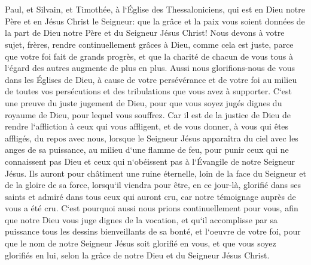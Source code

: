 

\chapter{}

\verse Paul, et Silvain, et Timothée, à l`Église des Thessaloniciens, qui est en Dieu notre Père et en Jésus Christ le Seigneur: 
\verse que la grâce et la paix vous soient données de la part de Dieu notre Père et du Seigneur Jésus Christ! 
\verse Nous devons à votre sujet, frères, rendre continuellement grâces à Dieu, comme cela est juste, parce que votre foi fait de grands progrès, et que la charité de chacun de vous tous à l`égard des autres augmente de plus en plus. 
\verse Aussi nous glorifions-nous de vous dans les Églises de Dieu, à cause de votre persévérance et de votre foi au milieu de toutes vos persécutions et des tribulations que vous avez à supporter. 
\verse C`est une preuve du juste jugement de Dieu, pour que vous soyez jugés dignes du royaume de Dieu, pour lequel vous souffrez. 
\verse Car il est de la justice de Dieu de rendre l`affliction à ceux qui vous affligent, 
\verse et de vous donner, à vous qui êtes affligés, du repos avec nous, lorsque le Seigneur Jésus apparaîtra du ciel avec les anges de sa puissance, 
\verse au milieu d`une flamme de feu, pour punir ceux qui ne connaissent pas Dieu et ceux qui n`obéissent pas à l`Évangile de notre Seigneur Jésus. 
\verse Ils auront pour châtiment une ruine éternelle, loin de la face du Seigneur et de la gloire de sa force, 
\verse lorsqu`il viendra pour être, en ce jour-là, glorifié dans ses saints et admiré dans tous ceux qui auront cru, car notre témoignage auprès de vous a été cru. 
\verse C`est pourquoi aussi nous prions continuellement pour vous, afin que notre Dieu vous juge dignes de la vocation, et qu`il accomplisse par sa puissance tous les dessins bienveillants de sa bonté, et l`oeuvre de votre foi, 
\verse pour que le nom de notre Seigneur Jésus soit glorifié en vous, et que vous soyez glorifiés en lui, selon la grâce de notre Dieu et du Seigneur Jésus Christ. 

\chapter{}

